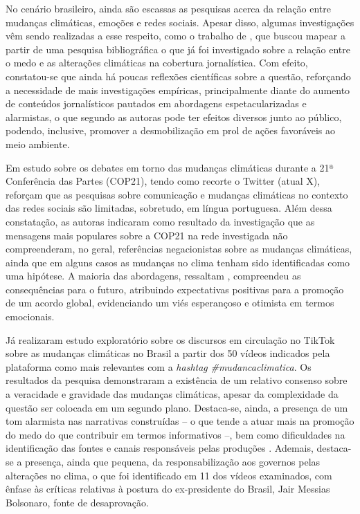 \documentclass[portuguese]{textolivre}
\begin{document}
No cenário brasileiro, ainda são escassas as pesquisas acerca da relação entre mudanças climáticas, emoções e redes sociais. Apesar disso, algumas investigações vêm sendo realizadas a esse respeito, como o trabalho de \textcite{balbe2020jornalismo}, que buscou mapear a partir de uma pesquisa bibliográfica o que já foi investigado sobre a relação entre o medo e as alterações climáticas na cobertura jornalística. Com efeito, constatou-se que ainda há poucas reflexões científicas sobre a questão, reforçando a necessidade de mais investigações empíricas, principalmente diante do aumento de conteúdos jornalísticos pautados em abordagens espetacularizadas e alarmistas, o que segundo as autoras pode ter efeitos diversos junto ao público, podendo, inclusive, promover a desmobilização em prol de ações favoráveis ao meio ambiente.

Em estudo sobre os debates em torno das mudanças climáticas durante a 21ª Conferência das Partes (COP21), tendo como recorte o Twitter (atual X), \textcite{balbe2017twitter} reforçam que as pesquisas sobre comunicação e mudanças climáticas no contexto das redes sociais são limitadas, sobretudo, em língua portuguesa. Além dessa constatação, as autoras indicaram como resultado da investigação que as mensagens mais populares sobre a COP21 na rede investigada não compreenderam, no geral, referências negacionistas sobre as mudanças climáticas, ainda que em alguns casos as mudanças no clima tenham sido identificadas como uma hipótese. A maioria das abordagens, ressaltam \textcite{balbe2017twitter}, compreendeu as consequências para o futuro, atribuindo expectativas positivas para a promoção de um acordo global, evidenciando um viés esperançoso e otimista em termos emocionais.

Já \textcite{evangelista2024narrativas} realizaram estudo exploratório sobre os discursos em circulação no TikTok sobre as mudanças climáticas no Brasil a partir dos 50 vídeos indicados pela plataforma como mais relevantes com a \textit{hashtag} \textit{\#mudancaclimatica}. Os resultados da pesquisa demonstraram a existência de um relativo consenso sobre a veracidade e gravidade das mudanças climáticas, apesar da complexidade da questão ser colocada em um segundo plano. Destaca-se, ainda, a presença de um tom alarmista nas narrativas construídas -- o que tende a atuar mais na promoção do medo do que contribuir em termos informativos --, bem como dificuldades na identificação das fontes e canais responsáveis pelas produções \textcite{evangelista2024narrativas}. Ademais, destaca-se a presença, ainda que pequena, da responsabilização aos governos pelas alterações no clima, o que foi identificado em 11 dos vídeos examinados, com ênfase às críticas relativas à postura do ex-presidente do Brasil, Jair Messias Bolsonaro, fonte de desaprovação.
\end{document}
